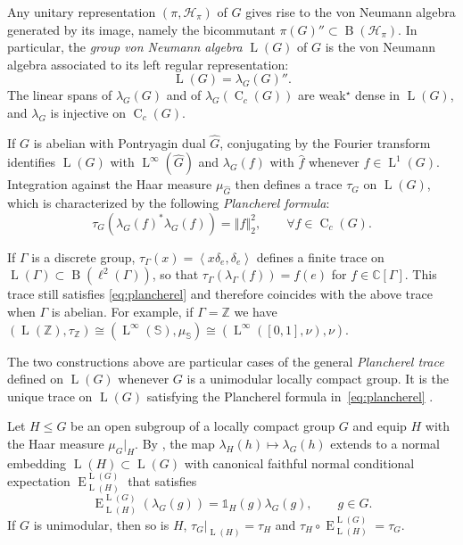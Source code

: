 \documentclass[11pt]{amsart}
\numberwithin{equation}{section}
\newcommand{\zz}{\mathbb Z}
\newcommand{\cc}{\mathbb C}
\newcommand{\un}{\mathds 1}
\renewcommand{\H}{\mathcal H}
\DeclareMathOperator{\LL}{L}
\newcommand{\norm}[1]{\left\Vert #1\right\Vert}
\newcommand{\ps}[2]{\left\langle #1,#2\right\rangle}
\newcommand{\rB}{\operatorname{B}}
\newcommand{\rC}{\operatorname{C}}
\newcommand{\rL}{\operatorname{L}}
\newcommand{\rE}{\operatorname{E}}
\theoremstyle{definition}
\begin{document}
Any unitary representation $(\pi,\H_\pi)$ of $G$ gives rise to the von Neumann algebra generated by its image, namely the bicommutant $\pi(G)''\subset\rB(\H_\pi)$.
In particular, the \emph{group von Neumann algebra} $\LL(G)$ of $G$ is the von Neumann algebra associated to its left regular representation: 
$$\LL(G)=\lambda_G(G)''.$$
The linear spans of $\lambda_G(G)$ and of $\lambda_G(\rC_c(G))$ are weak$^\star$ dense in $\LL(G)$, and $\lambda_G$ is injective on $\rC_c(G)$. 


If $G$ is abelian with Pontryagin dual $\widehat G$, conjugating by the Fourier transform identifies $\LL(G)$ with $\rL^\infty(\widehat G)$ and $\lambda_G(f)$ with $\widehat f$ whenever $f\in \rL^1(G)$. Integration against the Haar measure $\mu_{\widehat{G}}$ then defines a trace $\tau_G$ on $\LL(G)$, which is characterized by the following \emph{Plancherel formula}: 
\begin{equation}\label{eq:plancherel}
    \tau_G(\lambda_G(f)^*\lambda_G(f))=\norm{f}_2^2, \qquad \forall f\in\rC_c(G).
\end{equation}

If $\Gamma$ is a discrete group, $\tau_{\Gamma}(x)=\ps{x\delta_e}{\delta_e}$ defines a finite trace on $\LL(\Gamma)\subset \rB(\ell^2(\Gamma))$, so that $\tau_{\Gamma}(\lambda_{\Gamma}(f))=f(e)$ for $f\in\cc[\Gamma]$. This trace still satisfies \eqref{eq:plancherel} and therefore coincides with the above trace when $\Gamma$ is abelian. For example, if $\Gamma=\zz$ we have $(\LL(\zz),\tau_{\zz})\cong (\rL^{\infty}(\mathbb{S}),\mu_{\mathbb{S}})\cong (\rL^{\infty}([0,1],\nu),\nu)$.

The two constructions above are particular cases of the general \emph{Plancherel trace} defined on $\LL(G)$ whenever $G$ is a unimodular locally compact group. It is the unique trace on $\LL(G)$ satisfying the Plancherel formula in~\eqref{eq:plancherel} \cite[Section~VII.3]{Ta03}.

Let $H\leq G$ be an open subgroup of a locally compact group $G$ and equip $H$ with the Haar measure $\mu_G|_H$. By \cite[Proposition~2.9]{HR19}, the map $\lambda_H(h)\mapsto\lambda_G(h)$ extends to a normal embedding $\LL(H)\subset\LL(G)$ with canonical faithful normal conditional expectation $\rE_{\LL(H)}^{\LL(G)}$ that satisfies 
$$
    \rE_{\LL(H)}^{\LL(G)}(\lambda_G(g))=\un_H(g)\lambda_G(g),
    \qquad g\in G.
$$
If $G$ is unimodular, then so is $H$, $\tau_G|_{\LL(H)}=\tau_H$ and $\tau_H\circ \rE_{\LL(H)}^{\LL(G)}=\tau_G$.
\end{document}

